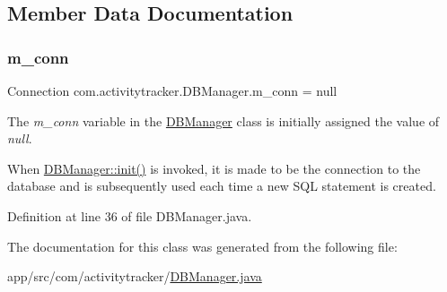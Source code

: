 \subsection{Member Data Documentation}
\mbox{\label{classcom_1_1activitytracker_1_1_d_b_manager_a064088d13ac09eb147fdc19268771521}} 
\subsubsection{\texorpdfstring{m\+\_\+conn}{m\_conn}}
{\footnotesize\ttfamily Connection com.\+activitytracker.\+D\+B\+Manager.\+m\+\_\+conn = null\hspace{0.3cm}{\ttfamily [private]}}

The {\itshape m\+\_\+conn} variable in the \mbox{\hyperlink{classcom_1_1activitytracker_1_1_d_b_manager}{D\+B\+Manager}} class is initially assigned the value of {\itshape null}.

When \mbox{\hyperlink{classcom_1_1activitytracker_1_1_d_b_manager_a41df4600bb5901a26a4ea6a7108a70b9}{D\+B\+Manager\+::init()}} is invoked, it is made to be the connection to the database and is subsequently used each time a new S\+QL statement is created. 

Definition at line 36 of file D\+B\+Manager.\+java.



The documentation for this class was generated from the following file\+:\begin{DoxyCompactItemize}
\item 
app/src/com/activitytracker/\mbox{\hyperlink{_d_b_manager_8java}{D\+B\+Manager.\+java}}\end{DoxyCompactItemize}
